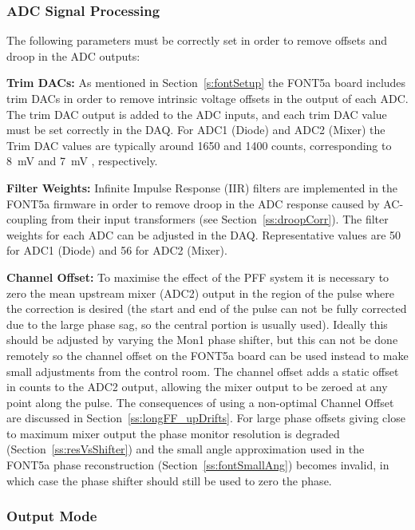 \subsubsection{ADC Signal Processing}

The following parameters must be correctly set in order to remove offsets and droop in the ADC outputs:

\textbf{Trim DACs:} As mentioned in Section~\ref{s:fontSetup} the FONT5a board includes trim DACs in order to remove intrinsic voltage offsets in the output of each ADC. The trim DAC output is added to the ADC inputs, and each trim DAC value must be set correctly in the DAQ. For ADC1 (Diode) and ADC2 (Mixer) the Trim DAC values are typically around 1650 and 1400 counts, corresponding to 8~mV and 7~mV \cite{dougThesis}, respectively.

\textbf{Filter Weights:} Infinite Impulse Response (IIR) filters are implemented in the FONT5a firmware in order to remove droop in the ADC response caused by AC-coupling from their input transformers (see Section~\ref{ss:droopCorr}). The filter weights for each ADC can be adjusted in the DAQ. Representative values are 50 for ADC1 (Diode) and 56 for ADC2 (Mixer).

\textbf{Channel Offset:} 
To maximise the effect of the PFF system it is necessary to zero the mean upstream mixer (ADC2) output in the region of the pulse where the correction is desired (the start and end of the pulse can not be fully corrected due to the large phase sag, so the central portion is usually used). 
Ideally this should be adjusted by varying the Mon1 phase shifter, but this can not be done remotely so the channel offset on the FONT5a board can be used instead to make small adjustments from the control room.
The channel offset adds a static offset in counts to the ADC2 output, allowing the mixer output to be zeroed at any point along the pulse. The consequences of using a non-optimal Channel Offset are discussed in Section~\ref{ss:longFF_upDrifts}. 
For large phase offsets giving close to maximum mixer output the phase monitor resolution is degraded (Section~\ref{ss:resVsShifter}) and the small angle approximation used in the FONT5a phase reconstruction (Section~\ref{ss:fontSmallAng}) becomes invalid, in which case the phase shifter should still be used to zero the phase. 

\subsubsection{Output Mode}

